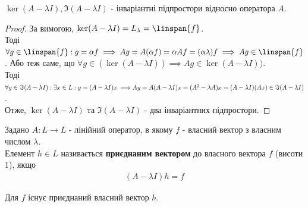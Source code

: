 \begin{lemma}
$\ker(A - \lambda I), \Im(A-\lambda I)$ - інваріантні підпростори відносно оператора $A$.
\end{lemma}

\begin{proof}
За вимогою, $\ker(A-\lambda I) = L_{\lambda} = \linspan\{f\}$.\\
Тоді $\forall g \in \linspan\{f\}: g = \alpha f \implies Ag = A(\alpha f) = \alpha Af = (\alpha \lambda) f \implies Ag \in \linspan\{f\}$. Або теж саме, що $\forall g \in (\ker(A - \lambda I)) \implies Ag \in  \ker(A - \lambda I))$.
\bigskip \\
Тоді $\forall y \in \Im(A-\lambda I): \exists x \in L: y = (A-\lambda I)x \implies \\ Ay = A(A-\lambda I)x = (A^2-\lambda A)x = (A-\lambda I)(Ax) \in \Im(A-\lambda I)$.\\
Отже, $\ker(A-\lambda I)$ та $\Im(A-\lambda I)$ - два інваріантних підпростори.
\end{proof}

\begin{definition}
Задано $A: L \to L$ - лінійний оператор, в якому $f$ - власний вектор з власним числом $\lambda$.\\
Елемент $h \in L$ називається \textbf{приєднаним вектором} до власного вектора $f$ (висоти 1), якщо
\begin{align*}
(A-\lambda I)h = f
\end{align*}
\end{definition}

\begin{lemma}
Для $f$ існує приєднаний власний вектор $h$.
\end{lemma}

